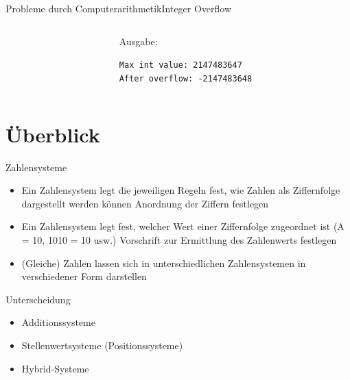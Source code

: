 \documentclass[xelatex,aspectratio=169]{beamer}
\begin{document}
\begin{frame}{Probleme durch Computerarithmetik}{Integer Overflow}
  \begin{columns}
    \begin{column}{0.6\textwidth}
      \small
      \inputminted{c}{src/zahlensysteme_ueberlauf.c}
    \end{column}
    \begin{column}{0.4\textwidth}
      Ausgabe:

      \texttt{Max int value: 2147483647} \\
      \texttt{After overflow: -2147483648}
    \end{column}
  \end{columns}
\end{frame}

\section{Überblick}

\begin{frame}{Zahlensysteme}
  \begin{itemize}
    \item Ein Zahlensystem legt die jeweiligen Regeln fest, wie Zahlen als Ziffernfolge dargestellt werden können \textrightarrow Anordnung der Ziffern festlegen
    \item Ein Zahlensystem legt fest, welcher Wert einer Ziffernfolge zugeordnet ist (A = 10, 1010 = 10 usw.) \textrightarrow Vorschrift zur Ermittlung des Zahlenwerts festlegen
    \item (Gleiche) Zahlen lassen sich in unterschiedlichen Zahlensystemen in verschiedener Form darstellen
  \end{itemize}

  \begin{block}{Unterscheidung}
    \begin{itemize}
      \item Additionssysteme
      \item Stellenwertsysteme (Positionssysteme)
      \item Hybrid-Systeme
    \end{itemize}
  \end{block}
\end{frame}
\end{document}
